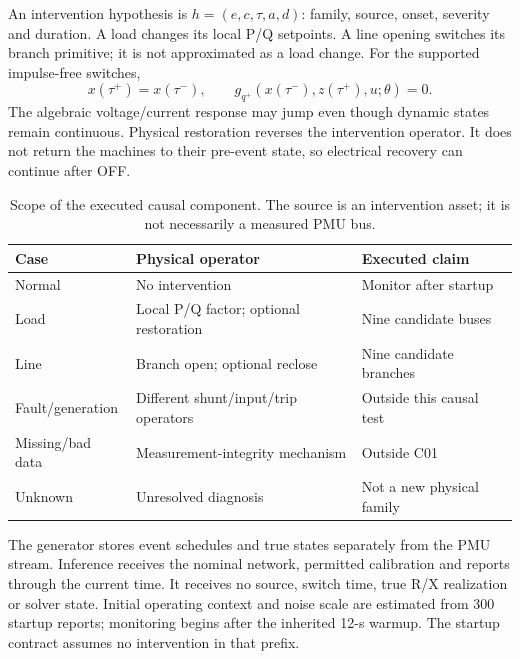 An intervention hypothesis is $h=(e,c,\tau,a,d)$: family, source, onset, severity and duration. A load changes its local P/Q setpoints. A line opening switches its branch primitive; it is not approximated as a load change. For the supported impulse-free switches,
\begin{equation}
 x(\tau^+)=x(\tau^-),\qquad g_{q^+}(x(\tau^-),z(\tau^+),u;\theta)=0.
 \label{eq:narrative-switch}
\end{equation}
The algebraic voltage/current response may jump even though dynamic states remain continuous. Physical restoration reverses the intervention operator. It does not return the machines to their pre-event state, so electrical recovery can continue after OFF.

\begin{table}[t]\centering\small
\caption{Scope of the executed causal component. The source is an intervention asset; it is not necessarily a measured PMU bus.}\label{tab:narrative-scope}
\begin{tabularx}{\columnwidth}{@{}lXX@{}}\toprule
Case & Physical operator & Executed claim\\\midrule
Normal & No intervention & Monitor after startup\\
Load & Local P/Q factor; optional restoration & Nine candidate buses\\
Line & Branch open; optional reclose & Nine candidate branches\\
Fault/generation & Different shunt/input/trip operators & Outside this causal test\\
Missing/bad data & Measurement-integrity mechanism & Outside C01\\
Unknown & Unresolved diagnosis & Not a new physical family\\\bottomrule
\end{tabularx}\end{table}

The generator stores event schedules and true states separately from the PMU stream. Inference receives the nominal network, permitted calibration and reports through the current time. It receives no source, switch time, true R/X realization or solver state. Initial operating context and noise scale are estimated from 300 startup reports; monitoring begins after the inherited 12-s warmup. The startup contract assumes no intervention in that prefix.
